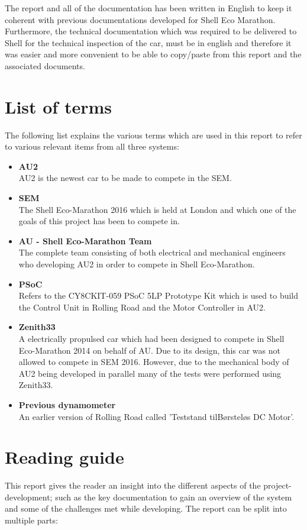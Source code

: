 The report and all of the documentation has been written in English to keep it coherent with previous documentations developed for Shell Eco Marathon. Furthermore, the technical documentation which was required to be delivered to Shell for the technical inspection of the car, must be in english and therefore it was easier and more convenient to be able to copy/paste from this report and the associated documents.

\section{List of terms}
The following list explains the various terms which are used in this report to refer to various relevant items from all three systems:
\begin{itemize}
	\item \textbf{AU2}\\
	AU2 is the newest car to be made to compete in the SEM.	
	\item \textbf{SEM}\\
	The Shell Eco-Marathon 2016 which is held at London and which one of the goals of this project has been to compete in.
	\item \textbf{AU - Shell Eco-Marathon Team}\\
	The complete team consisting of both electrical and mechanical engineers who developing AU2 in order to compete in Shell Eco-Marathon.
	\item \textbf{PSoC}\\
	Refers to the CY8CKIT-059 PSoC 5LP Prototype Kit which is used to build the Control Unit in Rolling Road and the Motor Controller in AU2.
	\item \textbf{Zenith33}\\
	A electrically propulsed car which had been designed to compete in Shell Eco-Marathon 2014\cite{BAC_zenith33} on behalf of AU. Due to its design, this car was not allowed to compete in SEM 2016. However, due to the mechanical body of AU2 being developed in parallel many of the tests were performed using Zenith33.
	\item \textbf{Previous dynamometer}\\
	An earlier version of Rolling Road called 'Teststand tilBørsteløs DC Motor'\cite{BAC_rullefelt}. 
\end{itemize}

\section{Reading guide}
This report gives the reader an insight into the different aspects of the project-development; such as the key documentation to gain an overview of the system and some of the challenges met while developing. The report can be split into multiple parts:

